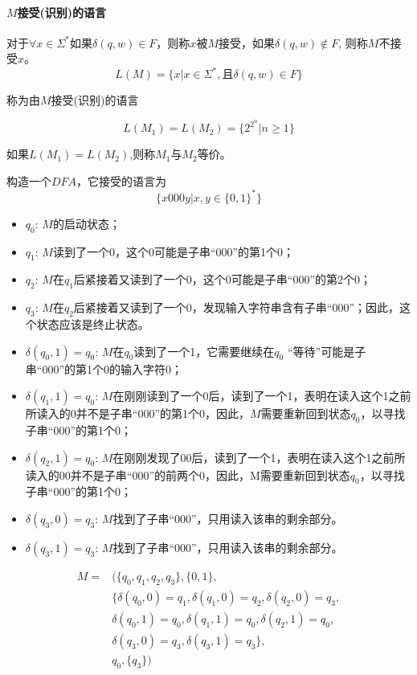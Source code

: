 \paragraph{\textbf{$M$接受(识别)的语言}}

对于$\forall x\in\Sigma^{\ast}$如果$\delta(q,w)\in F$，则称$x$被$M$接受，如果$\delta(q,w)\notin F$, 则称$M$不接受$x$。
\[L(M)=\{x|x\in\Sigma^{\ast},\text{且}\delta(q,w)\in F\}\]

称为由$M$接受(识别)的语言 

\[L(M_1)=L(M_2)=\{2^{2^n}|n\ge 1\}\]

如果$L(M_1)=L(M_2)$,则称$M_1$与$M_2$等价。

\begin{example}构造一个$DFA$，它接受的语言为
	\[\{x000y|x,y\in\{0,1\}^{\ast}\}\]
	\begin{itemize}
		\item $q_0$: $M$的启动状态；
	    \item $q_1$: $M$读到了一个0，这个0可能是子串“000”的第1个0；
	    \item $q_2$: $M$在$q_1$后紧接着又读到了一个0，这个0可能是子串“000”的第2个0；
		\item $q_3$: $M$在$q_2$后紧接着又读到了一个0，发现输入字符串含有子串“000”；因此，这个状态应该是终止状态。
	    \item $\delta(q_0,1)= q_0$: $M$在$q_0$读到了一个1，它需要继续在$q_0$ “等待”可能是子串“000”的第1个0的输入字符0；
		\item $\delta(q_1,1)= q_0$: $M$在刚刚读到了一个0后，读到了一个1，表明在读入这个1之前所读入的0并不是子串“000”的第1个0，因此，$M$需要重新回到状态$q_0$，以寻找子串“000”的第1个0；
		
		\item $\delta(q_2,1)= q_0$: $M$在刚刚发现了00后，读到了一个1，表明在读入这个1之前所读入的00并不是子串“000”的前两个0，因此，M需要重新回到状态$q_0$，以寻找子串“000”的第1个0；
		
		\item $\delta(q_3,0)= q_3$: $M$找到了子串“000”，只用读入该串的剩余部分。
		
		\item $\delta(q_3,1)= q_3$: $M$找到了子串“000”，只用读入该串的剩余部分。	
	\end{itemize}
	\begin{align*} 
	M=&(\{q_0,q_1,q_2,q_3\},\{0,1\},\\
	&\{\delta(q_0,0)=q_1,\delta(q_1,0)=q_2,\delta(q_2,0)=q_3,\\
	&\delta(q_0,1)=q_0,\delta(q_1,1)=q_0,\delta(q_2,1)=q_0,\\
	&\delta(q_3,0)=q_3,\delta(q_3,1)=q_3\},\\
	&q_0,\{q_3\})
	\end{align*}
	

\end{example}
